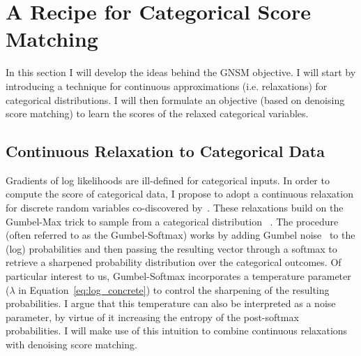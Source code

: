 



\section{A Recipe for Categorical Score Matching}
\label{sec:recipe}

In this section I will develop the ideas behind the GNSM objective. I will start by introducing a technique for continuous approximations (i.e. relaxations) for categorical distributions. I will then formulate an objective (based on denoising score matching) to learn the scores of the relaxed categorical variables. 

\subsection*{Continuous Relaxation to Categorical Data}

Gradients of log likelihoods are ill-defined for categorical inputs. In order to compute the score of categorical data, I propose to adopt a continuous relaxation for discrete random variables co-discovered by~\cite{jang2017categorical, maddison2017concrete}. These relaxations build on the Gumbel-Max trick to sample from a categorical distribution ~\cite{maddison2014sampling}. The procedure (often referred to as the Gumbel-Softmax) works by adding Gumbel noise~\cite{gumbel1954statistical} to the (log) probabilities and then passing the resulting vector through a softmax to retrieve a sharpened probability distribution over the categorical outcomes. Of particular interest to us, Gumbel-Softmax incorporates a temperature parameter ($\lambda$ in Equation~\eqref{eq:log_concrete}) to control the sharpening of the resulting probabilities. I argue that this temperature can also be interpreted as a noise parameter, by virtue of it increasing the entropy of the post-softmax probabilities. I will make use of this intuition to combine continuous relaxations with denoising score matching. 

